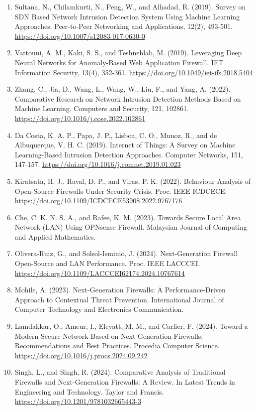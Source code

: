 \documentclass[12pt,a4paper]{article}
\begin{document}
\begin{enumerate}
\item Sultana, N., Chilamkurti, N., Peng, W., and Alhadad, R. (2019). Survey on SDN Based Network Intrusion Detection System Using Machine Learning Approaches. Peer-to-Peer Networking and Applications, 12(2), 493-501. \url{https://doi.org/10.1007/s12083-017-0630-0}
\item Vartouni, A. M., Kaki, S. S., and Teshnehlab, M. (2019). Leveraging Deep Neural Networks for Anomaly-Based Web Application Firewall. IET Information Security, 13(4), 352-361. \url{https://doi.org/10.1049/iet-ifs.2018.5404}
\item Zhang, C., Jia, D., Wang, L., Wang, W., Liu, F., and Yang, A. (2022). Comparative Research on Network Intrusion Detection Methods Based on Machine Learning. Computers and Security, 121, 102861. \url{https://doi.org/10.1016/j.cose.2022.102861}
\item Da Costa, K. A. P., Papa, J. P., Lisboa, C. O., Munoz, R., and de Albuquerque, V. H. C. (2019). Internet of Things: A Survey on Machine Learning-Based Intrusion Detection Approaches. Computer Networks, 151, 147-157. \url{https://doi.org/10.1016/j.comnet.2019.01.023}
\item Kiratsata, H. J., Raval, D. P., and Viras, P. K. (2022). Behaviour Analysis of Open-Source Firewalls Under Security Crisis. Proc. IEEE ICDCECE. \url{https://doi.org/10.1109/ICDCECE53908.2022.9767176}
\item Che, C. K. N. S. A., and Rafee, K. M. (2023). Towards Secure Local Area Network (LAN) Using OPNsense Firewall. Malaysian Journal of Computing and Applied Mathematics.
\item Olivera-Ruiz, G., and Solsol-Isminio, J. (2024). Next-Generation Firewall Open-Source and LAN Performance. Proc. IEEE LACCCEI. \url{https://doi.org/10.1109/LACCCEI62174.2024.10767614}
\item Mohile, A. (2023). Next-Generation Firewalls: A Performance-Driven Approach to Contextual Threat Prevention. International Journal of Computer Technology and Electronics Communication.
\item Lamdakkar, O., Ameur, I., Eleyatt, M. M., and Carlier, F. (2024). Toward a Modern Secure Network Based on Next-Generation Firewalls: Recommendations and Best Practices. Procedia Computer Science. \url{https://doi.org/10.1016/j.procs.2024.09.242}
\item Singh, L., and Singh, R. (2024). Comparative Analysis of Traditional Firewalls and Next-Generation Firewalls: A Review. In Latest Trends in Engineering and Technology. Taylor and Francis. \url{https://doi.org/10.1201/9781032665443-3}

\end{enumerate}
\end{document}
